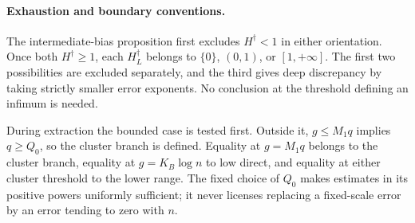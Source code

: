 \endgroup

\paragraph{Exhaustion and boundary conventions.}
The intermediate-bias proposition first excludes $H^\dagger<1$ in either
orientation. Once both $H^\dagger\ge1$, each $H_L^\dagger$ belongs to
$\{0\}$, $(0,1)$, or $[1,+\infty]$. The first two possibilities are
excluded separately, and the third gives deep discrepancy by taking
strictly smaller error exponents. No conclusion at the threshold defining
an infimum is needed.

During extraction the bounded case is tested first. Outside it,
$g\le M_1q$ implies $q\ge Q_0$, so the cluster branch is defined.
Equality at $g=M_1q$ belongs to the cluster branch, equality at
$g=K_B\log n$ to low direct, and equality at either cluster threshold
to the lower range. The fixed choice of $Q_0$ makes estimates in its
positive powers uniformly sufficient; it never licenses replacing a
fixed-scale error by an error tending to zero with $n$.
